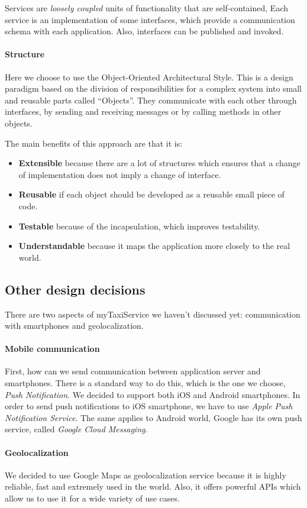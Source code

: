 Services are \textit{loosely coupled} units of functionality that are self-contained, 
Each service is an implementation of some interfaces, which provide a communication schema with
each application. Also, interfaces can be published and invoked.

\paragraph{Structure} Here we choose to use the Object-Oriented Architectural Style.
This is a design paradigm based on the division of responsibilities for a complex system
into small and reusable parts called ``Objects''.
They communicate with each other through interfaces, by sending and receiving messages
or by calling methods in other objects.

The main benefits of this approach are that it is:

\begin{itemize}
    \item{\textbf{Extensible} because there are a lot of structures which ensures that a change of implementation does not imply a change of interface.}
    \item{\textbf{Reusable} if each object should be developed as a reusable small piece of code.}
    \item{\textbf{Testable} because of the incapsulation, which improves testability.}
    \item{\textbf{Understandable} because it maps the application more closely to the real world.}
\end{itemize}

\subsection{Other design decisions}

There are two aspects of myTaxiService we haven't discussed yet: communication 
with smartphones and geolocalization.

\paragraph {Mobile communication}
First, how can we send communication between application server and smartphones.
There is a standard way to do this, which is the one we choose, \textit{Push Notification}.
We decided to support both iOS and Android smartphones. In order to send push
notifications to iOS smartphone, we have to use \textit{Apple Push Notification Service}.
The same applies to Android world, Google has its own push service, called 
\textit{Google Cloud Messaging}.

\paragraph {Geolocalization}
We decided to use Google Maps as geolocalization service because it is highly
reliable, fast and extremely used in the world.
Also, it offers powerful APIs which allow us to use it for a wide variety of use cases.
